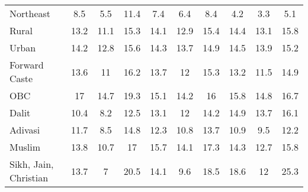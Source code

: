 \begin{tabular}{l*{9}{c}}
Northeast           &         8.5&         5.5&        11.4&         7.4&         6.4&         8.4&         4.2&         3.3&         5.1\\
Rural               &        13.2&        11.1&        15.3&        14.1&        12.9&        15.4&        14.4&        13.1&        15.8\\
Urban               &        14.2&        12.8&        15.6&        14.3&        13.7&        14.9&        14.5&        13.9&        15.2\\
Forward Caste       &        13.6&          11&        16.2&        13.7&          12&        15.3&        13.2&        11.5&        14.9\\
OBC                 &          17&        14.7&        19.3&        15.1&        14.2&          16&        15.8&        14.8&        16.7\\
Dalit               &        10.4&         8.2&        12.5&        13.1&          12&        14.2&        14.9&        13.7&        16.1\\
Adivasi             &        11.7&         8.5&        14.8&        12.3&        10.8&        13.7&        10.9&         9.5&        12.2\\
Muslim              &        13.8&        10.7&          17&        15.7&        14.1&        17.3&        14.3&        12.7&        15.8\\
Sikh, Jain, Christian&        13.7&           7&        20.5&        14.1&         9.6&        18.5&        18.6&          12&        25.3\\
\bottomrule
\end{tabular}
